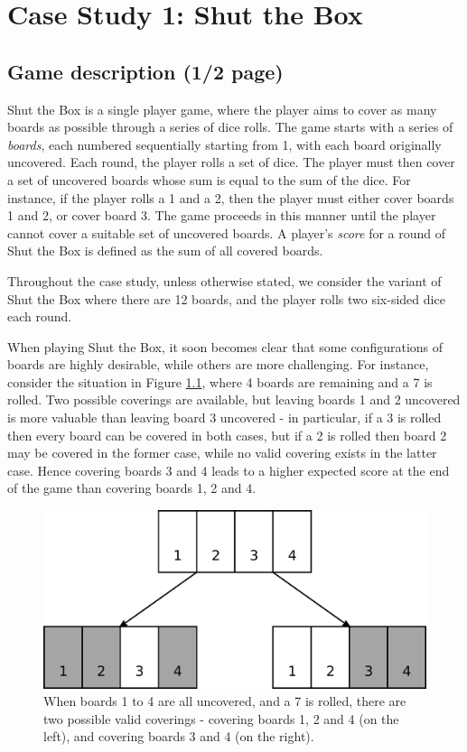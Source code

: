 \chapter{Case Study 1: Shut the Box}
\label{cs1}

\section{Game description (1/2 page)}
\label{cs1:stb_description}
Shut the Box is a single player game, where the player aims to cover as many boards as possible through a series of dice rolls. The game starts with a series of \emph{boards}, each numbered sequentially starting from 1, with each board originally uncovered. Each round, the player rolls a set of dice. The player must then cover a set of uncovered boards whose sum is equal to the sum of the dice. For instance, if the player rolls a 1 and a 2, then the player must either cover boards 1 and 2, or cover board 3. The game proceeds in this manner until the player cannot cover a suitable set of uncovered boards. A player's \emph{score} for a round of Shut the Box is defined as the sum of all covered boards.

Throughout the case study, unless otherwise stated, we consider the variant of Shut the Box where there are 12 boards, and the player rolls two six-sided dice each round.

When playing Shut the Box, it soon becomes clear that some configurations of boards are highly desirable, while others are more challenging. For instance, consider the situation in Figure \ref{cs1:cover_choice}, where 4 boards are remaining and a 7 is rolled. Two possible coverings are available, but leaving boards 1 and 2 uncovered is more valuable than leaving board 3 uncovered - in particular, if a 3 is rolled then every board can be covered in both cases, but if a 2 is rolled then board 2 may be covered in the former case, while no valid covering exists in the latter case. Hence covering boards 3 and 4 leads to a higher expected score at the end of the game than covering boards 1, 2 and 4.

\begin{figure}
\label{cs1:cover_choice}
    \centering
    \includegraphics[width=0.5\linewidth]{images/cover_choice.pdf}
    \caption{When boards 1 to 4 are all uncovered, and a 7 is rolled, there are two possible valid coverings - covering boards 1, 2 and 4 (on the left), and covering boards 3 and 4 (on the right).}
\end{figure}

